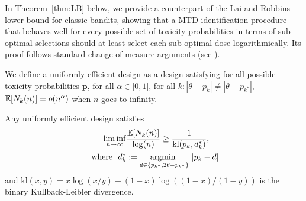 In Theorem~\ref{thm:LB} below, we provide a counterpart of the Lai and Robbins lower bound for classic bandits, showing that a MTD identification procedure that behaves well for every possible set of toxicity probabilities in terms of sub-optimal selections should at least select each sub-optimal dose logarithmically. Its proof follows standard change-of-measure arguments (see \cite{GMS18}). 


\begin{theorem}\label{thm:LB} We define a uniformly efficient design as a design satisfying for all possible toxicity probabilities $\bm p$, for all $\alpha \in ]0,1[$, for all $k : |\theta - p_k| \neq |\theta - p_{k^*}|$, $\mathbb{E}[N_k(n)] = o(n^\alpha)$ when $n$ goes to infinity. 

Any uniformly efficient design satisfies 
\begin{align*}
\liminf_{n \rightarrow \infty} &\frac{\mathbb{E}[N_k(n)]}{\log(n)}
	\geq \frac{1}{\mathrm{kl}(p_k,d_k^*)},
\\
	\ \text{where } \ d_k^* &:= \underset{d \in \{p_{k^*},2\theta - p_{k^*}\}}{\text{argmin }} \ |p_k - d |
\end{align*}
and $\mathrm{kl}(x,y) = x\log(x/y)+(1-x)\log((1-x)/(1-y))$ is the binary Kullback-Leibler divergence.
\end{theorem}



% 

